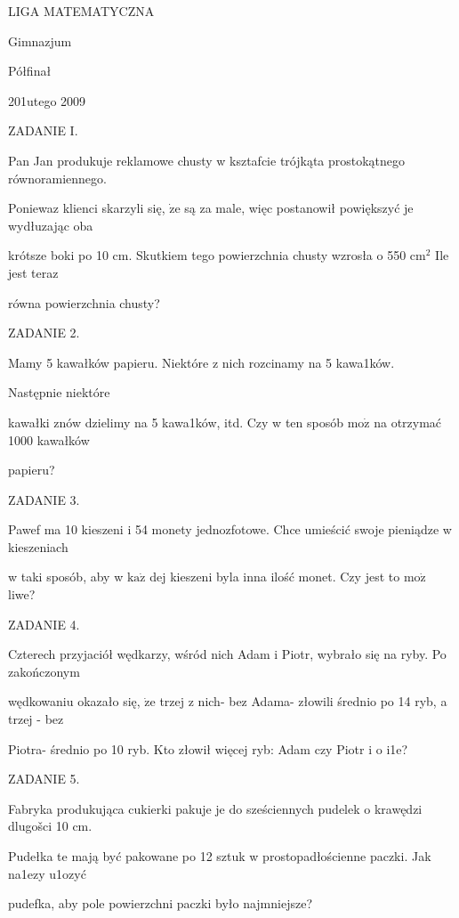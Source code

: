 \documentclass[a4paper,12pt]{article}
\begin{document}
LIGA MATEMATYCZNA

Gimnazjum

Półfinał

201utego 2009

ZADANIE I.

Pan Jan produkuje reklamowe chusty w ksztafcie trójkąta prostokątnego równoramiennego.

Poniewaz klienci skarzyli się, $\dot{\mathrm{z}}\mathrm{e}$ są za male, więc postanowił powiększyć je wydłuzając oba

krótsze boki po 10 cm. Skutkiem tego powierzchnia chusty wzrosła o 550 $\mathrm{c}\mathrm{m}^{2}$ Ile jest teraz

równa powierzchnia chusty?

ZADANIE 2.

Mamy 5 kawałków papieru. Niektóre z nich rozcinamy na 5 kawa1ków.

Następnie niektóre

kawałki znów dzielimy na 5 kawa1ków, itd. Czy w ten sposób $\mathrm{m}\mathrm{o}\dot{\mathrm{z}}$ na otrzymać 1000 kawałków

papieru?

ZADANIE 3.

Pawef ma 10 kieszeni i 54 monety jednozfotowe. Chce umieścić swoje pieniądze w kieszeniach

w taki sposób, aby w $\mathrm{k}\mathrm{a}\dot{\mathrm{z}}$ dej kieszeni byla inna ilość monet. Czy jest to $\mathrm{m}\mathrm{o}\dot{\mathrm{z}}$ liwe?

ZADANIE 4.

Czterech przyjaciół wędkarzy, wśród nich Adam i Piotr, wybrało się na ryby. Po zakończonym

wędkowaniu okazało się, $\dot{\mathrm{z}}\mathrm{e}$ trzej z nich- bez Adama- złowili średnio po 14 ryb, a trzej - bez

Piotra- średnio po 10 ryb. Kto złowił więcej ryb: Adam czy Piotr i o i1e?

ZADANIE 5.

Fabryka produkująca cukierki pakuje je do sześciennych pudelek o krawędzi dlugošci 10 cm.

Pudełka te mają być pakowane po 12 sztuk w prostopadłościenne paczki. Jak na1ezy u1ozyć

pudefka, aby pole powierzchni paczki było najmniejsze?
\end{document}
